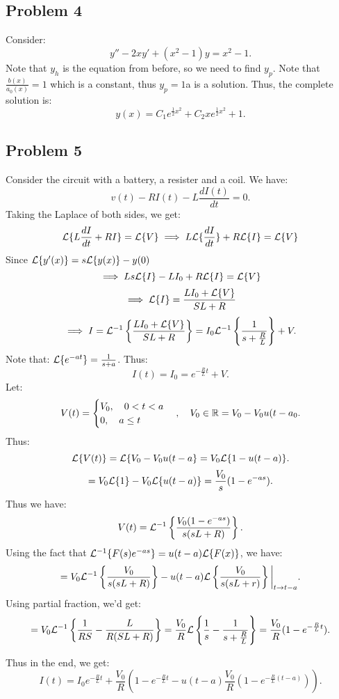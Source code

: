 \documentclass[../main/main.tex]{subfiles}
\begin{document}
\subsection{Problem 4}
Consider: \[
	y''-2xy'+(x^2-1)y = x^2-1
.\] Note that $y_h$ is the equation from before, so we need to find  $y_p$. Note that  $\frac{b(x)}{a_0(x)} = 1$ which is a constant, thus $y_p=1$a is a solution. Thus, the complete solution is:  \[
y(x) = C_1 e^{\frac{1}{2}x^2}+C_2 xe^{\frac{1}{2}x^2} + 1
.\] 
\subsection{Problem 5}
Consider the circuit with a battery, a resister and a coil. We have: \[
	v(t) - RI(t) - L \frac{dI(t)}{dt}=0
.\] Taking the Laplace of both sides, we get: \[
\mathcal{L} \{L \frac{dI}{dt}+RI\} = \mathcal{L} \{V\}  \implies L \mathcal{L} \{\frac{dI}{dt}\} +R\mathcal{L} \{I\} =\mathcal{L} \{V\} 
\]Since $\mathcal{L} \{y'(x)\} =s\mathcal{L} \{y(x)\} -y(0)$\[
\implies Ls\mathcal{L} \{I\} -L I_0 + R\mathcal{L} \{I\} =\mathcal{L} \{V\}  
\]  \[
 \implies \mathcal{L} \{I\}  = \frac{LI_0+\mathcal{L} \{V\} }{SL+R}
\] \[
\implies I = \mathcal{L}^{-1}\left\{ \frac{LI_0+\mathcal{L} \{V\} }{SL+R}\right\} = I_0 \mathcal{L}^{-1}\left\{ \frac{1}{s+\frac{R}{L}} \right\} + V
.\] Note that: $ \mathcal{L} \{e^{-at}\} = \frac{1}{s+a}$. Thus: \[
I(t) = I_0 = e^{-\frac{R}{L}t} + V
.\]  
Let: \[
	V(t) = \begin{cases}
		V_0, \quad 0 < t < a\\
		0, \quad a \le t
	\end{cases},\quad V_0\in \mathbb{R} = V_0-V_0u(t-a_0
.\] Thus: \[
\mathcal{L} \{V(t)\} =\mathcal{L} \{V_0-V_0u(t-a\} = V_0\mathcal{L} \{1-u(t-a)\}  
.\] \[
= V_0\mathcal{L} \{1\} -V_0 \mathcal{L} \{u(t-a)\}  = \frac{V_0}{s}(1-e^{-as})
.\] Thus we have: \[
V(t) = \mathcal{L} ^{-1}\left\{ \frac{V_0(1-e^{-as})}{s(sL+R)} \right\} 
.\] Using the fact that $\mathcal{L} ^{-1} \{F(s) e^{-as}\} =u(t-a) \mathcal{L} \{F(x)\} $, we have: \[
= V_0 \mathcal{L} ^{-1} \left\{ \frac{V_0}{s(sL+R)}\right\} -u(t-a) \mathcal{L} \left\{ \frac{V_0}{s(sL+r)}\right\} \bigg\rvert_{t\to t-a}
.\] Using partial fraction, we'd get: \[
= V_0 \mathcal{L} ^{-1} \left\{ \frac{1}{RS}- \frac{L}{R(SL+R)}\right\} = \frac{V_0}{R}\mathcal{L} \left\{ \frac{1}{s} - \frac{1}{s+\frac{R}{L}}\right\} = \frac{V_0}{R}(1-e^{-\frac{R}{L}t})
.\] 

Thus in the end, we get: \[
	I(t) = I_0 e^{-\frac{R}{L}t}+\frac{V_0}{R}\left( 1-e^{-\frac{R}{L}t}-u(t-a) \frac{V_0}{R}\left( 1-e^{-\frac{R}{L}(t-a)} \right)  \right) 
.\] 
\end{document}
